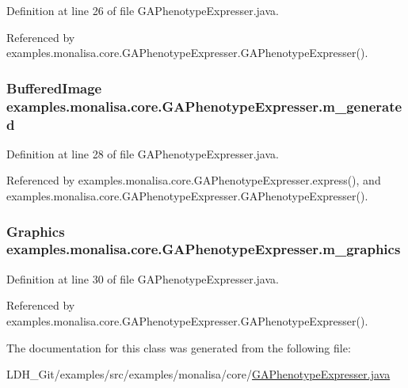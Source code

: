 Definition at line 26 of file G\-A\-Phenotype\-Expresser.\-java.



Referenced by examples.\-monalisa.\-core.\-G\-A\-Phenotype\-Expresser.\-G\-A\-Phenotype\-Expresser().

\hypertarget{classexamples_1_1monalisa_1_1core_1_1_g_a_phenotype_expresser_aeae59439813b0a07fc08be1ab4542d70}{
\subsubsection[{m\-\_\-generated}]{\setlength{\rightskip}{0pt plus 5cm}Buffered\-Image examples.\-monalisa.\-core.\-G\-A\-Phenotype\-Expresser.\-m\-\_\-generated\hspace{0.3cm}{\ttfamily [private]}}}\label{classexamples_1_1monalisa_1_1core_1_1_g_a_phenotype_expresser_aeae59439813b0a07fc08be1ab4542d70}


Definition at line 28 of file G\-A\-Phenotype\-Expresser.\-java.



Referenced by examples.\-monalisa.\-core.\-G\-A\-Phenotype\-Expresser.\-express(), and examples.\-monalisa.\-core.\-G\-A\-Phenotype\-Expresser.\-G\-A\-Phenotype\-Expresser().

\hypertarget{classexamples_1_1monalisa_1_1core_1_1_g_a_phenotype_expresser_a1a07330141a226465b6545edb3bc0710}{
\subsubsection[{m\-\_\-graphics}]{\setlength{\rightskip}{0pt plus 5cm}Graphics examples.\-monalisa.\-core.\-G\-A\-Phenotype\-Expresser.\-m\-\_\-graphics\hspace{0.3cm}{\ttfamily [private]}}}\label{classexamples_1_1monalisa_1_1core_1_1_g_a_phenotype_expresser_a1a07330141a226465b6545edb3bc0710}


Definition at line 30 of file G\-A\-Phenotype\-Expresser.\-java.



Referenced by examples.\-monalisa.\-core.\-G\-A\-Phenotype\-Expresser.\-G\-A\-Phenotype\-Expresser().



The documentation for this class was generated from the following file\-:\begin{DoxyCompactItemize}
\item 
L\-D\-H\-\_\-\-Git/examples/src/examples/monalisa/core/\hyperlink{_g_a_phenotype_expresser_8java}{G\-A\-Phenotype\-Expresser.\-java}\end{DoxyCompactItemize}
